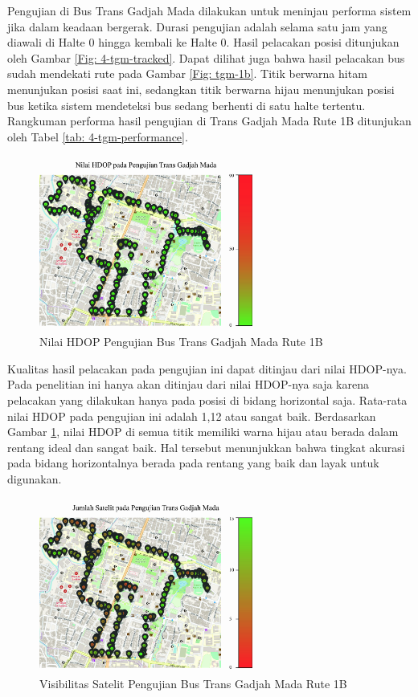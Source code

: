 \documentclass[conference]{IEEEtran}
\begin{document}
Pengujian di Bus Trans Gadjah Mada dilakukan untuk meninjau performa sistem jika dalam keadaan bergerak. Durasi pengujian adalah selama satu jam yang diawali di Halte 0 hingga kembali ke Halte 0. Hasil pelacakan posisi ditunjukan oleh Gambar \ref{Fig: 4-tgm-tracked}. Dapat dilihat juga bahwa hasil pelacakan bus sudah mendekati rute pada Gambar \ref{Fig: tgm-1b}. Titik berwarna hitam menunjukan posisi saat ini, sedangkan titik berwarna hijau menunjukan posisi bus ketika sistem mendeteksi bus sedang berhenti di satu halte tertentu. Rangkuman performa hasil pengujian di Trans Gadjah Mada Rute 1B ditunjukan oleh Tabel \ref{tab: 4-tgm-performance}.

\begin{figure}[htb!]
	\centering
	\includegraphics[width=7cm]{moving-HDOP.jpg}
	\caption{Nilai HDOP Pengujian Bus Trans Gadjah Mada Rute 1B}
	\label{Fig: 4-tgm-hdop}
\end{figure}

Kualitas hasil pelacakan pada pengujian ini dapat ditinjau dari nilai HDOP-nya. Pada penelitian ini hanya akan ditinjau dari nilai HDOP-nya saja karena pelacakan yang dilakukan hanya pada posisi di bidang horizontal saja. Rata-rata nilai HDOP pada pengujian ini adalah 1,12 atau sangat baik. Berdasarkan Gambar \ref{Fig: 4-tgm-hdop}, nilai HDOP di semua titik memiliki warna hijau atau berada dalam rentang ideal dan sangat baik. Hal tersebut menunjukkan bahwa tingkat akurasi pada bidang horizontalnya berada pada rentang yang baik dan layak untuk digunakan.

\begin{figure}[htb!]
	\centering
	\includegraphics[width=7cm]{moving-SATS.jpg}
	\caption{Visibilitas Satelit Pengujian Bus Trans Gadjah Mada Rute 1B}
	\label{Fig: 4-tgm-sats}
\end{figure}
\end{document}
